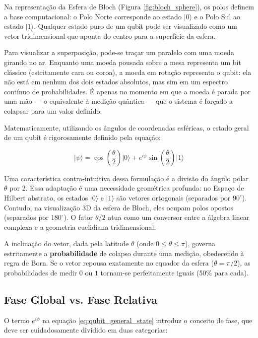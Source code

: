 \documentclass[12pt, a4paper]{article}
\newcommand{\ket}[1]{\lvert #1 \rangle}
\begin{document}
Na representação da Esfera de Bloch (Figura \ref{fig:bloch_sphere}), os polos definem a base computacional: o Polo Norte corresponde ao estado $\ket{0}$ e o Polo Sul ao estado $\ket{1}$. Qualquer estado puro de um qubit pode ser visualizado como um vetor tridimensional que aponta do centro para a superfície da esfera.

Para visualizar a superposição, pode-se traçar um paralelo com uma moeda girando no ar. Enquanto uma moeda pousada sobre a mesa representa um bit clássico (estritamente cara ou coroa), a moeda em rotação representa o qubit: ela não está em nenhum dos dois estados absolutos, mas sim em um espectro contínuo de probabilidades. É apenas no momento em que a moeda é parada por uma mão --- o equivalente à medição quântica --- que o sistema é forçado a colapsar para um valor definido.

Matematicamente, utilizando os ângulos de coordenadas esféricas,  o estado geral de um qubit é rigorosamente definido pela equação:

\begin{equation}
    \ket{\psi} = \cos\left(\frac{\theta}{2}\right)\ket{0} + e^{i\phi}\sin\left(\frac{\theta}{2}\right)\ket{1}
    \label{eq:qubit_general_state}
\end{equation}

Uma característica contra-intuitiva dessa formulação é a divisão do ângulo polar $\theta$ por 2. Essa adaptação é uma necessidade geométrica profunda: no Espaço de Hilbert abstrato, os estados $\ket{0}$ e $\ket{1}$ são vetores ortogonais (separados por $90^\circ$). Contudo, na visualização 3D da esfera de Bloch, eles ocupam polos opostos (separados por $180^\circ$). O fator $\theta/2$ atua como um conversor entre a álgebra linear complexa e a geometria euclidiana tridimensional.

A inclinação do vetor, dada pela latitude $\theta$ (onde $0 \le \theta \le \pi$), governa estritamente a \textbf{probabilidade} de colapso durante uma medição, obedecendo à regra de Born. Se o vetor repousa exatamente no equador da esfera ($\theta = \pi/2$), as probabilidades de medir $0$ ou $1$ tornam-se perfeitamente iguais (50\% para cada).

\subsection{Fase Global vs. Fase Relativa}

O termo $e^{i\phi}$ na equação \ref{eq:qubit_general_state} introduz o conceito de fase, que deve ser cuidadosamente dividido em duas categorias:
\end{document}
